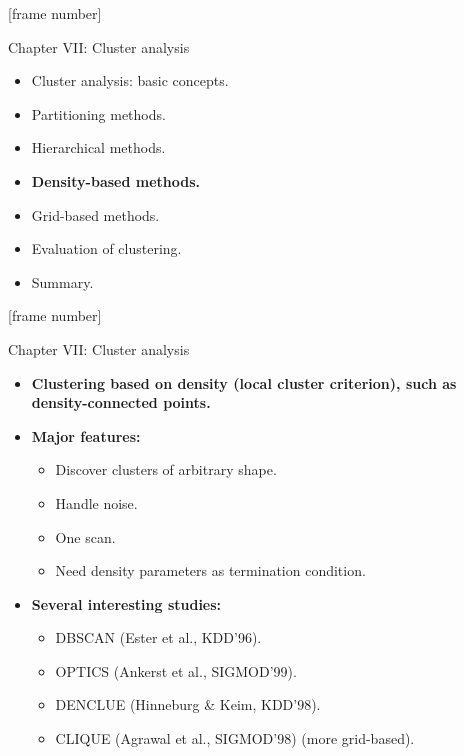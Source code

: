 \documentclass[aspectratio=169,t,xcolor=dvipsnames]{beamer}
\begin{document}
  {
    [frame number]
    \begin{frame}{Chapter VII: Cluster analysis}
        \begin{itemize}
            \item Cluster analysis: basic concepts.
            \item Partitioning methods.
            \item Hierarchical methods.
            \item \textbf{Density-based methods.}
            \item Grid-based methods.
            \item Evaluation of clustering.
            \item Summary.
        \end{itemize}
    \end{frame}
  }

  {
    [frame number]
    \begin{frame}{Chapter VII: Cluster analysis}
        \begin{itemize}
          \item \textbf{Clustering based on density (local cluster criterion), such as density-connected points.}
          \item \textbf{Major features:}
          \begin{itemize}
            \item Discover clusters of arbitrary shape.
            \item Handle noise.
            \item One scan.
            \item Need density parameters as termination condition.
          \end{itemize}
          \item \textbf{Several interesting studies:}
          \begin{itemize}
            \item DBSCAN (Ester et al., KDD'96).
            \item OPTICS (Ankerst et al., SIGMOD'99).
            \item DENCLUE (Hinneburg \& Keim, KDD'98).
            \item CLIQUE (Agrawal et al., SIGMOD'98) (more grid-based).
          \end{itemize}
        \end{itemize}
    \end{frame}
  }
\end{document}
